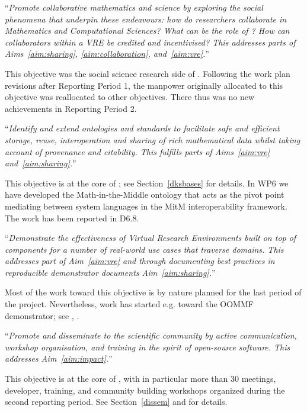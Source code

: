 \begin{compactenum}[\bf O1\rm:]
\item \label{objective:social} ``\emph{Promote collaborative mathematics and
  science by exploring the social phenomena that underpin these
  endeavours: how do researchers collaborate in Mathematics and
  Computational Sciences?  What can be the role of \VREs?  How can
  collaborators within a VRE be credited and incentivised? This
  addresses parts of Aims~\ref{aim:sharing}, \ref{aim:collaboration},
  and~\ref{aim:vre}.}''

This objective was the social science research side of
. Following the work plan revisions after
Reporting Period 1, the manpower originally allocated to this
objective was reallocated to other objectives. There thus was no new
achievements in Reporting Period 2.

\item \label{objective:data} ``\emph{Identify and extend ontologies and
  standards to facilitate safe and efficient storage, reuse,
  interoperation and sharing of rich mathematical data whilst taking
  account of provenance and citability. This fulfills parts of
  Aims~\ref{aim:vre} and~\ref{aim:sharing}.}''
 
This objective is at the core of ; see Section~\ref{dksbases} for
details. In WP6 we have developed the Math-in-the-Middle ontology that acts as the pivot
point mediating between system languages in the MitM interoperability framework. The work
has been reported in D6.8.

\item \label{objective:demo} ``\emph{Demonstrate the effectiveness of Virtual
  Research Environments built on top of \ODK components for a
  number of real-world use cases that traverse domains. This addresses
  part of Aim~\ref{aim:vre} and through documenting best practices in
  reproducible demonstrator documents Aim~\ref{aim:sharing}.}''

Most of the work toward this objective is by nature planned for the last period of the \pn
project. Nevertheless, work has started e.g.  toward the OOMMF demonstrator; see
,
.

\item \label{objective:disseminate} ``\emph{Promote and disseminate
  \ODK to the scientific community by active communication,
  workshop organisation, and training in the spirit of open-source
  software. This addresses Aim~\ref{aim:impact}.}''

This objective is at the core of , with in particular
more than 30 meetings, developer, training, and community building
workshops organized during the second reporting period. See
Section~\ref{dissem} and  for
details.
\end{compactenum}

